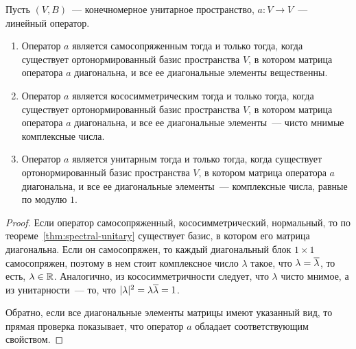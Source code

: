 \begin{theorem}\label{thm:unitary_canonical_forms}
Пусть $(V,B)$~--- конечномерное унитарное пространство,
$a\colon V\to V$~--- линейный оператор.
\begin{enumerate}
\item Оператор $a$ является самосопряженным тогда и
только тогда, когда существует ортонормированный базис пространства
$V$, в котором матрица оператора $a$ диагональна, и все ее
диагональные элементы вещественны.
\item Оператор $a$ является кососимметрическим тогда и
только тогда, когда существует ортонормированный базис пространства
$V$, в котором матрица оператора $a$ диагональна, и все ее
диагональные элементы~--- чисто мнимые комплексные числа.
\item Оператор $a$ является унитарным тогда и
только тогда, когда существует ортонормированный базис пространства
$V$, в котором матрица оператора $a$ диагональна, и все ее
диагональные элементы~--- комплексные числа, равные по модулю $1$.
\end{enumerate}
\end{theorem}
\begin{proof}
Если оператор самосопряженный, кососимметрический, нормальный, то по
теореме~\ref{thm:spectral-unitary} существует базис, в котором его
матрица диагональна. Если он самосопряжен, то каждый диагональный
блок $1\times 1$ самосопряжен, поэтому в нем стоит комплексное число
$\lambda$ такое, что $\lambda=\overline\lambda$, то есть, $\lambda\in\mathbb R$.
Аналогично, из кососимметричности следует, что $\lambda$ чисто мнимое,
а из унитарности~--- то, что $|\lambda|^2 = \lambda\overline\lambda = 1$.

Обратно, если все диагональные элементы матрицы имеют указанный вид,
то прямая проверка показывает, что оператор $a$ обладает
соответствующим свойством.
\end{proof}

